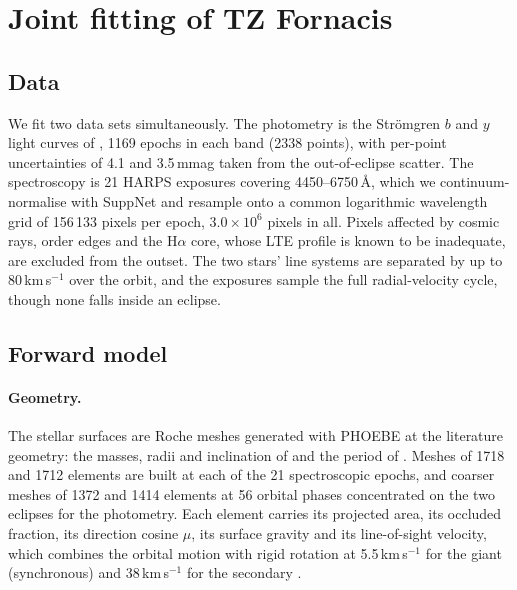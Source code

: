 
\section{Joint fitting of TZ Fornacis}
\label{sec:tzfor_fit}

\subsection{Data}

We fit two data sets simultaneously. The photometry is the Str\"omgren $b$ and
$y$ light curves of \citet{Clausen1991}, 1169 epochs in each band (2338 points),
with per-point uncertainties of 4.1 and 3.5\,mmag taken from the out-of-eclipse
scatter. The spectroscopy is 21 HARPS exposures covering 4450--6750\,\AA, which we
continuum-normalise with SuppNet and resample onto a common logarithmic
wavelength grid of 156\,133 pixels per epoch, $3.0\times10^{6}$ pixels in all.
Pixels affected by cosmic rays, order edges and the H$\alpha$ core, whose LTE
profile is known to be inadequate, are excluded from the outset. The two stars'
line systems are separated by up to 80\,km\,s$^{-1}$ over the orbit, and the
exposures sample the full radial-velocity cycle, though none falls inside an
eclipse.

\subsection{Forward model}

\paragraph{Geometry.}
The stellar surfaces are Roche meshes generated with PHOEBE \citep{Prsa2016} at
the literature geometry: the masses, radii and inclination of
\citet{Andersen1991} and the period of \citet{Gallenne2016}. Meshes of 1718 and
1712 elements are built at each of the 21 spectroscopic epochs, and coarser meshes
of 1372 and 1414 elements at 56 orbital phases concentrated on the two eclipses
for the photometry. Each element carries its projected area, its occluded
fraction, its direction cosine $\mu$, its surface gravity and its line-of-sight
velocity, which combines the orbital motion with rigid rotation at
5.5\,km\,s$^{-1}$ for the giant (synchronous) and 38\,km\,s$^{-1}$ for the
secondary \citep{Andersen1991}.

